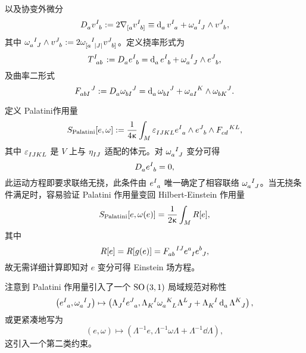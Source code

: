 		以及协变外微分
		\begin{equation}
			\tensor{D}{_a} \tensor{v}{^I_b} \definedby 2 \Nabla{{[a}} \tensor{v}{^I_{b]}} \equiv \tensor{\dd{}}{_a} \tensor{v}{^I_a} + \tensor{\omega}{_a^I_J} \wedge \tensor{v}{^J_b},
		\end{equation}
		其中 $\tensor{\omega}{_a^I_J} \wedge \tensor{v}{^J_b} \definedby 2 \tensor{\omega}{_{[a}^I_{|J|}} \tensor{v}{^J_{b]}}$。定义挠率形式为
		\begin{equation}
			\tensor{T}{^I_a_b} \definedby \tensor{D}{_a} \tensor{e}{^I_b} = \tensor{\dd{}}{_a} \tensor{e}{^I_b} + \tensor{\omega}{_a^I_J} \wedge \tensor{e}{^J_b},
		\end{equation}
		及曲率二形式
		\begin{equation}
			\tensor{F}{_a_b_I^J} \definedby \tensor{D}{_{a}} \tensor{\omega}{_{b}_I^J} = \tensor{\dd{}}{_a} \tensor{\omega}{_b_I^J} + \tensor{\omega}{_a_I^K} \wedge \tensor{\omega}{_b_K^J}.
		\end{equation}

		定义 Palatini作用量
		\begin{equation}
			S_{\text{Palatini}} [e,\omega] \definedby \frac{1}{4\gkappa} \int_M \tensor{\vol}{_I_J_K_L} \tensor{e}{^I_a} \wedge \tensor{e}{^J_b} \wedge \tensor{F}{_c_d^K^L},
		\end{equation}
		其中 $\tensor{\vol}{_I_J_K_L}$ 是 $V$ 上与 $\tensor{\eta}{_I_J}$ 适配的体元。对 $\tensor{\omega}{_a^I_J}$ 变分可得
		\begin{equation}
			\tensor{D}{_a} \tensor{e}{^I_b} = 0,
		\end{equation}
		此运动方程即要求联络无挠，此条件由 $\tensor{e}{^I_a}$ 唯一确定了相容联络 $\tensor{\omega}{_a^I_J}$。当无挠条件满足时，容易验证 Palatini 作用量变回 Hilbert-Einstein 作用量
		\begin{equation}
			S_{\text{Palatini}} [e,\omega(e)] = \frac{1}{2\upkappa}\int_M R[e],
		\end{equation}
		其中
		\begin{equation}
			R[e] = R[g(e)] = \tensor{F}{_a_b^I^J} \tensor{e}{^a_I} \tensor{e}{^b_J},
		\end{equation}
		故无需详细计算即知对 $e$ 变分可得 Einstein 场方程。


		注意到 Palatini 作用量引入了一个 $\mathrm{SO}\left(3,1\right)$ 局域规范对称性
		\begin{equation}
			\left( \tensor{e}{^I_a}, \tensor{\omega}{_a^I_J} \right) \mapsto \left( \tensor{\Lambda}{_J^I} \tensor{e}{^J_a}, \tensor{\Lambda}{_K^I} \tensor{\omega}{_a^K_L} \tensor{\Lambda}{^L_J} + \tensor{\Lambda}{_K^I} \tensor{\dd{}}{_a} \tensor{\Lambda}{^K_J} \right),
		\end{equation}
		或更紧凑地写为
		\begin{equation}
			(e,\omega) \mapsto \left( \Lambda^{-1} e, \Lambda^{-1} \omega \Lambda + \Lambda^{-1} \dd{\Lambda} \right),
		\end{equation}
		这引入一个第二类约束。

